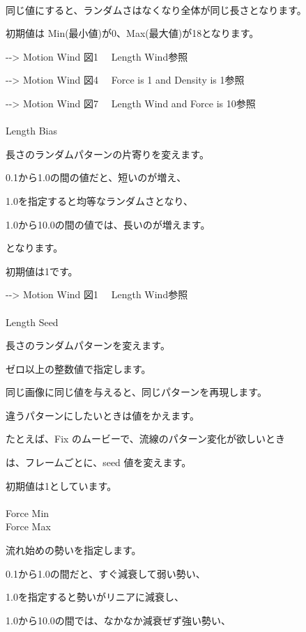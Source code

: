 \documentclass[a4paper,12pt]{article}
\begin{document}
\newpage

\thispagestyle{empty}

\ \vspace{-0.2em}
\par
同じ値にすると、ランダムさはなくなり全体が同じ長さとなります。\par
初期値は Min(最小値)が0、Max(最大値)が18となります。\par
-{-}> \textquotedbl Motion Wind 図1 \ \ Length Wind\textquotedbl 参照\par
-{-}> \textquotedbl Motion Wind 図4 \ \ Force is 1 and Density is 1\textquotedbl 参照\par
-{-}> \textquotedbl Motion Wind 図7 \ \ Length Wind and Force is 10\textquotedbl 参照\\
\\
Length Bias\par
長さのランダムパターンの片寄りを変えます。\par
0.1から1.0の間の値だと、短いのが増え、\par
1.0を指定すると均等なランダムさとなり、\par
1.0から10.0の間の値では、長いのが増えます。\par
となります。\par
初期値は1です。\par
-{-}> \textquotedbl Motion Wind 図1 \ \ Length Wind\textquotedbl 参照\\
\\
Length Seed\par
長さのランダムパターンを変えます。\par
ゼロ以上の整数値で指定します。\par
同じ画像に同じ値を与えると、同じパターンを再現します。\par
違うパターンにしたいときは値をかえます。\par
たとえば、Fix のムービーで、流線のパターン変化が欲しいとき\par
は、フレームごとに、seed 値を変えます。\par
初期値は1としています。\\
\\
Force Min\\
Force Max\par
流れ始めの勢いを指定します。\par
0.1から1.0の間だと、すぐ減衰して弱い勢い、\par
1.0を指定すると勢いがリニアに減衰し、\par
1.0から10.0の間では、なかなか減衰ぜず強い勢い、\par
\end{document}
